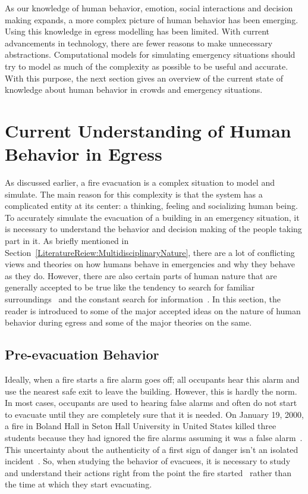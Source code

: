 As our knowledge of human behavior, emotion, social interactions and decision making expands, a more complex picture of human behavior has been emerging. Using this knowledge in egress modelling has been limited. With current advancements in technology, there are fewer reasons to make unnecessary abstractions. Computational models for simulating emergency situations should try to model as much of the complexity as possible to be useful and accurate. With this purpose, the next section gives an overview of the current state of knowledge about human behavior in crowds and emergency situations.

\section{Current Understanding of Human Behavior in Egress}
\label{LiteratureReview:CurrentUnderstanding}

As discussed earlier, a fire evacuation is a complex situation to model and simulate. The main reason for this complexity is that the system has a complicated entity at its center: a thinking, feeling and socializing human being. To accurately simulate the evacuation of a building in an emergency situation, it is necessary to understand the behavior and decision making of the people taking part in it. As briefly mentioned in Section~\ref{LiteratureReiew:MultidisciplinaryNature}, there are a lot of conflicting views and theories on how humans behave in emergencies and why they behave as they do. However, there are also certain parts of human nature that are generally accepted to be true like the tendency to search for familiar surroundings~\cite{Mawson:2005tq,Paulsen:1984ti,Ramachandran:1990wj,Sandberg:1997tw} and the constant search for information~\cite{Proulx:2003tc,Tong:1985wn,Ozel:2001tn,Sime:1983uy}. In this section, the reader is introduced to some of the major accepted ideas on the nature of human behavior during egress and some of the major theories on the same.

\subsection{Pre-evacuation Behavior}
\label{LiteratureReview:HowItAllBegins}
Ideally, when a fire starts a fire alarm goes off; all occupants hear this alarm and use the nearest safe exit to leave the building. However, this is hardly the norm. In most cases, occupants are used to hearing false alarms and often do not start to evacuate until they are completely sure that it is needed. On January 19, 2000, a fire in Boland Hall in Seton Hall University in United States killed three students because they had ignored the fire alarms assuming it was a false alarm~\cite{Berry:2000us}. This uncertainty about the authenticity of a first sign of danger isn't an isolated incident~\cite{Graham:2000vl,Proulx:2001we,Proulx:1995wq,Proulx:2003tc,Purser:2001ts,Ramachandran:1990wj,Sime:1995uu,Tong:1985wn}. So, when studying the behavior of evacuees, it is necessary to study and understand their actions right from the point the fire started~\cite{Tong:1985wn} rather than the time at which they start evacuating.


